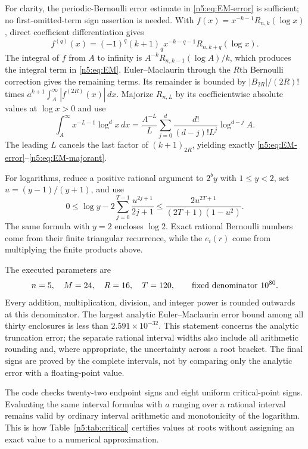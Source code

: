 For clarity, the periodic-Bernoulli error estimate in
\eqref{n5:eq:EM-error} is sufficient; no first-omitted-term sign assertion
is needed.  With
$f(x)=x^{-k-1}R_{n,k}(\log x)$, direct coefficient differentiation gives
\[
 f^{(q)}(x)=(-1)^q(k+1)_q x^{-k-q-1}
                            R_{n,k+q}(\log x).
\]
The integral of $f$ from $A$ to infinity is
$A^{-k}R_{n,k-1}(\log A)/k$, which produces the integral term in
\eqref{n5:eq:EM}.  Euler--Maclaurin through the $R$th Bernoulli
correction gives the remaining terms.  Its remainder is bounded by
$|B_{2R}|/(2R)!$ times $a^{k+1}\int_A^\infty|f^{(2R)}(x)|\,dx$.
Majorize $R_{n,L}$ by its coefficientwise absolute values at
$\log x>0$ and use
\[
 \int_A^\infty x^{-L-1}\log^d x\,dx
  =\frac{A^{-L}}{L}
        \sum_{j=0}^{d}\frac{d!}{(d-j)!L^j}\log^{d-j}A.
\]
The leading $L$ cancels the last factor of $(k+1)_{2R}$, yielding
exactly \eqref{n5:eq:EM-error}--\eqref{n5:eq:EM-majorant}.

For logarithms, reduce a positive rational argument to $2^b y$ with
$1\leq y<2$, set $u=(y-1)/(y+1)$, and use
\begin{equation}\label{n5:eq:log-error}
 0\leq\log y-2\sum_{j=0}^{T-1}\frac{u^{2j+1}}{2j+1}
 \leq\frac{2u^{2T+1}}{(2T+1)(1-u^2)}.
\end{equation}
The same formula with $y=2$ encloses $\log2$.  Exact rational
Bernoulli numbers come from their finite triangular recurrence, while
the $e_i(r)$ come from multiplying the finite products above.

The executed parameters are
\[
       n=5,\quad M=24,\quad R=16,\quad T=120,
       \qquad\hbox{fixed denominator }10^{80}.
\]
Every addition, multiplication, division, and integer power is rounded
outwards at this denominator.  The largest analytic
Euler--Maclaurin error bound among all thirty enclosures is less than
$2.591\times10^{-32}$.  This statement concerns the analytic truncation
error; the separate rational interval widths also include all arithmetic
rounding and, where appropriate, the uncertainty across a root bracket.
The final signs are proved by the complete intervals, not by comparing
only the analytic error with a floating-point value.

The code checks twenty-two endpoint signs and eight uniform
critical-point signs.  Evaluating the same interval formulas with
$a$ ranging over a rational interval remains valid by ordinary interval
arithmetic and monotonicity of the logarithm.  This is how
Table~\ref{n5:tab:critical} certifies values at roots without assigning
an exact value to a numerical approximation.


